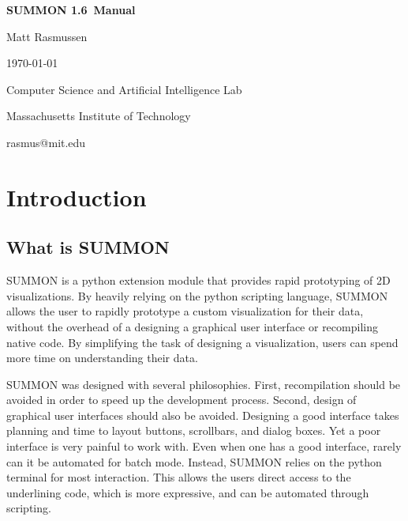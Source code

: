 \documentclass[12pt]{article}
\newcommand{\version}{1.6}
\begin{document}
\begin{titlepage}

\begin{center}

\vspace*{2.5in}

{\huge \bf {}\selectfont 
SUMMON \version\ Manual
}
\vspace*{.5in}

{\large
Matt Rasmussen

\today
}
\vspace*{.5in}

Computer Science and Artificial Intelligence Lab

Massachusetts Institute of Technology

\vspace*{.25in}

rasmus@mit.edu
\end{center}

\end{titlepage}


\tableofcontents

\clearpage

\section{Introduction}
\label{sec:intro}


\subsection{What is SUMMON}

SUMMON is a python extension module that provides rapid prototyping of 2D
visualizations.  By heavily relying on the python scripting language, SUMMON
allows the user to rapidly prototype a custom visualization for their data, 
without the overhead of a designing a graphical user interface or recompiling 
native code.  By simplifying the task of designing a visualization, users can 
spend more time on understanding their data. 

SUMMON was designed with several philosophies.  First, recompilation should
be avoided in order to speed up the development process.  Second, design of
graphical user interfaces should also be avoided.  Designing a good interface
takes planning and time to layout buttons, scrollbars, and dialog boxes.  Yet a 
poor interface is very painful to work with. Even when one has a good interface,
rarely can it be automated for batch mode.  Instead, SUMMON relies on the
python terminal for most interaction.  This allows the users direct access to 
the underlining code, which is more expressive, and can be automated through
scripting.  
\end{document}
